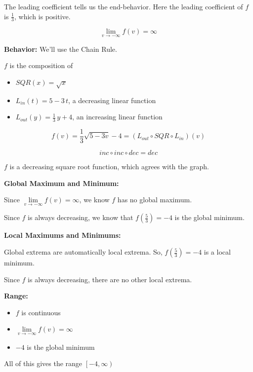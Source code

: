 \documentclass{ximera}
\begin{document}
\begin{example}
The leading coefficient tells us the end-behavior. Here the leading coefficient of $f$ is $\frac{1}{3}$, which is positive.


\[  \lim\limits_{v \to -\infty} f(v) = \infty   \]







\textbf{Behavior:}  We'll use the Chain Rule.

$f$ is the composition of

\begin{itemize}
\item $SQR(x) = \sqrt{x}$ 

\item $L_{in}(t) = 5 - 3 \, t$, a decreasing linear function

\item $L_{out}(y) = \frac{1}{3} \, y + 4$, an increasing linear function
\end{itemize}


\[  f(v) =  \frac{1}{3} \sqrt{5-3v}-4 = (L_{out} \circ SQR \circ L_{in})(v) \]

\[ inc \circ inc \circ dec = dec  \]


$f$ is a decreasing square root function, which agrees with the graph.



\textbf{Global Maximum and Minimum:} 


Since $\lim\limits_{v \to -\infty} f(v) = \infty$, we know $f$ has no global maximum.

Since $f$ is always decreasing, we know that $f\left( \frac{5}{3} \right) = -4$ is the global minimum.


\textbf{Local Maximums and Minimums:} 

Global extrema are automatically local extrema.  So, $f\left( \frac{5}{3} \right) = -4$ is a local minimum.

Since $f$ is always decreasing, there are no other local extrema.


\textbf{Range:} 

\begin{itemize}
\item $f$ is continuous
\item $\lim\limits_{v \to -\infty} f(v) = \infty$
\item $-4$ is the global minimum
\end{itemize}

All of this gives the range  $\left[ -4, \infty \right)$



\end{example}
\end{document}

